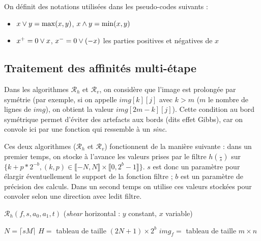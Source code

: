 
 On définit des notations utilisées dans les pseudo-codes suivants :
 \begin{itemize}
 \item $x \vee y = \max(x,y)$, $x \wedge y = \min(x,y)$
 \item $x^+ = 0 \vee x$, $x^- = 0 \vee (-x)$ les parties positives et négatives de $x$
 \end{itemize}
 
 \subsection*{Traitement des affinités multi-étape}
  
  Dans les algorithmes $\mathcal{R}_h$ et $\mathcal{R}_v$, on considère que l'image est prolongée par symétrie (par exemple, si on appelle $img[k][j]$ avec $k > m$ ($m$ le nombre de lignes de $img$), on obtient la valeur $img[2m-k][j]$). Cette condition au bord symétrique permet d'éviter des artefacts aux bords (dits effet Gibbs), car on convole ici par une fonction qui ressemble à un \emph{sinc}.
  
  Ces deux algorithmes ($\mathcal{R}_h$ et $\mathcal{R}_v$) fonctionnent de la manière suivante : dans un premier temps, on stocke à l'avance les valeurs prises par le filtre $h(\frac{\dot{}}{s})$ sur $\{k+p*2^{-b},(k,p)\in \llbracket -N,N \rrbracket \times \llbracket 0,2^b-1 \rrbracket\}$. $s$ est donc un paramètre pour élargir éventuellement le support de la fonction filtre ; $b$ est un paramètre de précision des calculs. Dans un second  temps on utilise ces valeurs stockées pour convoler selon une direction avec ledit filtre.
  
   \begin{algorithme}
    \caption{$\mathcal{R}_h(f,s,a_0,a_1,t)$ (\textit{shear} horizontal : $y$ constant, $x$ variable)}
    $N = \lceil sM \rceil$\;
    $H = $ tableau de taille $(2N+1) \times 2^b$\;
    $img_f = $ tableau de taille $m \times n$\;
    \label{szeliski_rh}
   \end{algorithme}










